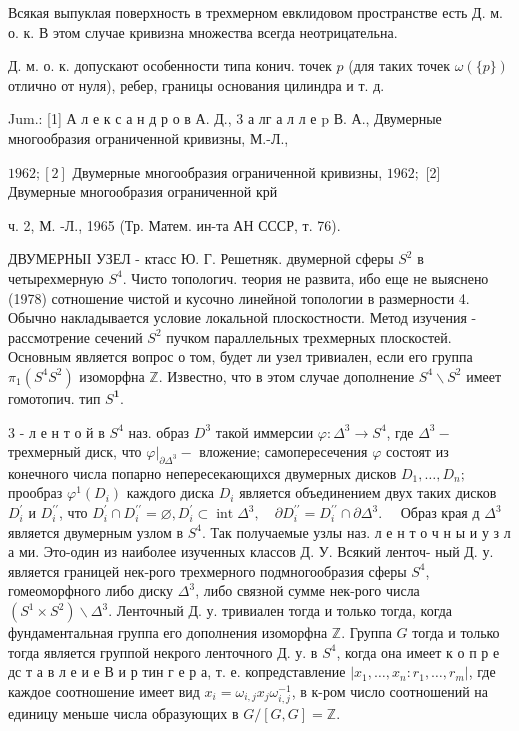 \documentclass[10pt]{article}
\begin{document}
Всякая выпуклая поверхность в трехмерном евклидовом пространстве есть Д. м. о. к. В этом случае кривизна множества всегда неотрицательна.



Д. м. о. к. допускают особенности типа конич. точек $p$ (для таких точек $\omega(\{p\})$ отлично от нуля), ребер, границы основания цилиндра и т. д.



Jum.: [1] А л е к с а н д р о в А. Д., 3 а лг а л л е p В. А., Двумерные многообразия ограниченной кривизны, М.-Л.,

$1962 ;[2]$ Двумерные многообразия ограниченной кривизны, $1962 ;$ [2] Двумерные многообразия ограниченной крй

ч. 2, М. -Л., 1965 (Тр. Матем. ин-та АН СССР, т. 76).



ДВУМЕРНЫІ УЗЕЛ - ктасс Ю. Г. Решетняк. двумерной сферы $S^{2}$ в четырехмерную $S^{4}$. Чисто топологич. теория не развита, ибо еще не выяснено (1978) сотношение чистой и кусочно линейной топологии в размерности 4. Обычно накладывается условие локальной плоскостности. Метод изучения - рассмотрение сечений $S^{2}$ пучком параллельных трехмерных плоскостей. Основным является вопрос о том, будет ли узел тривиален, если его группа $\pi_{1}\left(S^{4} S^{2}\right)$ изоморфна $\mathbb{Z}$. Известно, что в этом случае дополнение $S^{4} \backslash S^{2}$ имеет гомотопич. тип $S^{\mathbf{1}}$.



3 - л е н т о й в $S^{4}$ наз. образ $D^{3}$ такой иммерсии $\varphi: \Delta^{3} \rightarrow S^{4}$, где $\Delta^{3}-$ трехмерный диск, что $\left.\varphi\right|_{\partial \Delta^{3}}-$ вложение; самопересечения $\varphi$ состоят из конечного числа попарно непересекающихся двумерных дисков $D_{1}, \ldots, D_{n} ;$ прообраз $\varphi^{1}\left(D_{i}\right)$ каждого диска $D_{i}$ является объединением двух таких дисков $D_{i}^{\prime}$ и $D_{i}^{\prime \prime}$, что $D_{i}^{\prime} \cap D_{i}^{\prime \prime}=\varnothing, D_{i}^{\prime} \subset \operatorname{int} \Delta^{3}, \quad \partial D_{i}^{\prime \prime}=D_{i}^{\prime \prime} \cap \partial \Delta^{3} . \quad$ Образ края д $\Delta^{3}$ является двумерным узлом в $S^{4}$. Так получаемые узлы наз. л е н т о ч н ы и у з л а ми. Это-один из наиболее изученных классов Д. У. Всякий ленточ- ный Д. у. является границей нек-рого трехмерного подмногообразия сферы $S^{4}$, гомеоморфного либо диску $\Delta^{3}$, либо связной сумме нек-рого числа $\left(S^{1} \times S^{2}\right) \backslash \Delta^{3}$. Ленточный Д. у. тривиален тогда и только тогда, когда фундаментальная группа его дополнения изоморфна $\mathbb{Z}$. Группа $G$ тогда и только тогда является группой некрого ленточного Д. у. в $S^{4}$, когда она имеет к о п р е дс т а в л е и е В и р тин г е р а, т. е. копредставление $\left|x_{1}, \ldots, x_{n}: r_{1}, \ldots, r_{m}\right|$, где каждое соотношение имеет вид $x_{i}=\omega_{i, j} x_{j} \omega_{i, j}^{-1}$, в к-ром число соотношений на единицу меньше числа образующих в $G /[G, G]=\mathbb{Z}$.
\end{document}
